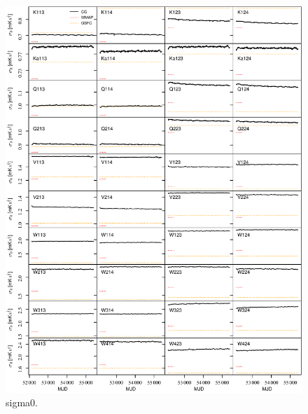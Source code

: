 \documentclass[twocolumn]{../../common/aa}
\begin{document}
\begin{figure}[p]
	\centering
	\includegraphics[width=\textwidth]{figures/instpar_CG_sigma0_v1.pdf}
	\caption{sigma0.}
	\label{fig:sigma0}
\end{figure}
\end{document}
